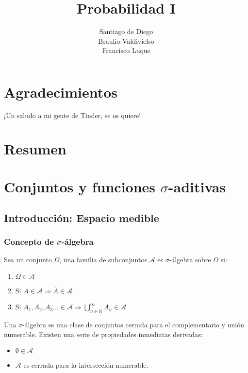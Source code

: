 \documentclass[12pt,a4paper]{book}
\author{Santiago de Diego\\Braulio Valdivielso\\Francisco Luque}
\title{Probabilidad I}
\date{}
\begin{document}
\maketitle
\newtheorem{theorem}{Teorema}[section]
\newtheorem{lemma}{Lema}[section]
\newtheorem{criterion}{Criterio}[section]
\newtheorem{proof}{Demostración}[section]
\newpage
\chapter*{Agradecimientos} %

¡Un saludo a mi gente de Tinder, se os quiere!

\chapter*{Resumen} %

\tableofcontents
\chapter{Conjuntos y funciones $\sigma$-aditivas}

\section{Introducción: Espacio medible}

\subsection*{Concepto de $\sigma$-álgebra}
Sea un conjunto $\Omega$, una
familia de subconjuntos $\mathcal{A}$ es $\sigma$-álgebra sobre $\Omega$ si: 
\begin{enumerate}
\item $\Omega \in \mathcal{A}$
\item Si $A \in \mathcal{A} \Rightarrow \overline{A} \in \mathcal{A}$
\item Si $A_1, A_2, A_3\ldots \in \mathcal{A} \Rightarrow \displaystyle \bigcup_{n \in \mathbb{N}}^{\infty} A_n \in \mathcal{A}$
\end{enumerate}
Una $\sigma$-álgebra es una clase de conjuntos cerrada para el complementario y unión numerable. Existen una serie de propiedades inmediatas derivadas:
\begin{itemize}
	\item $\emptyset \in \mathcal{A}$
	\item $\mathcal{A}$ es cerrada para la  intersección numerable.
\end{itemize}
\end{document}

